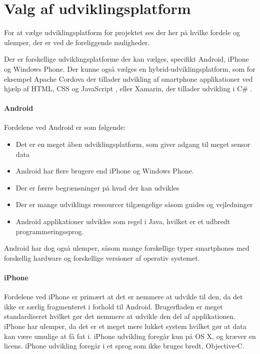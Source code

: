 \section{Valg af udviklingsplatform}\label{sec:valg_af_android}
For at vælge udviklingsplatform for projektet ses der her på hvilke fordele og ulemper, der er ved de foreliggende muligheder.

Der er forskellige udviklingsplatforme der kan vælges, specifikt Android, iPhone og Windows Phone.
Der kunne også vælges en hybrid-udviklingsplatform, som for eksempel Apache Cordova der tillader udvikling af smartphone applikationer ved hjælp af HTML, CSS og JavaScript \citep{misc:apachecordova}, eller Xamarin, der tillader udvikling i C\# \citep{misc:xamarin}.

\paragraph{Android}
Fordelene ved Android er som følgende:
\begin{itemize}
\item Det er en meget åben udviklingsplatform, som giver adgang til meget sensor data
\item Android har flere brugere end iPhone og Windows Phone.
\item Der er færre begrænsninger på hvad der kan udvikles
\item Der er mange udviklings ressourcer tilgængelige såsom guides og vejledninger
\item Android applikationer udvikles som regel i Java, hvilket er et udbredt programmeringssprog.
\end{itemize}

Android har dog også ulemper, såsom mange forskellige typer smartphones med forskellig hardware og forskellige versioner af operativ systemet.

\paragraph{iPhone}
Fordelene ved iPhone er primært at det er nemmere at udvikle til den, da det ikke er særlig fragmenteret i forhold til Android. 
Brugerfladen er meget standardiseret hvilket gør det nemmere at udvikle den del af applikationen. 
iPhone har ulemper, da det er et meget mere lukket system hvilket gør at data kan være umulige at få fat i. iPhone udvikling foregår kun på OS X, og kræver en licens. iPhone udvikling foregår i et sprog som ikke bruges bredt, Objective-C.


